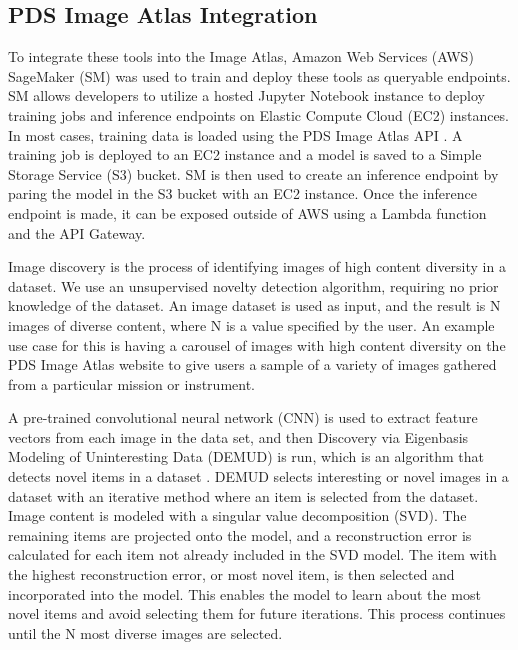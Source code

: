 \subsection{PDS Image Atlas Integration}
To integrate these tools into the Image Atlas, Amazon Web Services (AWS) SageMaker (SM) was used to train and deploy these tools as queryable endpoints. 
SM allows developers to utilize a hosted Jupyter Notebook instance to deploy training jobs and inference endpoints on Elastic Compute Cloud (EC2) instances. 
In most cases, training data is loaded using the PDS Image Atlas API \parencite{grimes2018pds}. 
A training job is deployed to an EC2 instance and a model is saved to a Simple Storage Service (S3) bucket. 
SM is then used to create an inference endpoint by paring the model in the S3 bucket with an EC2 instance. 
Once the inference endpoint is made, it can be exposed outside of AWS using a Lambda function and the API Gateway.

Image discovery is the process of identifying images of high content diversity in a dataset.
We use an unsupervised novelty detection algorithm, requiring no prior knowledge of the dataset. 
An image dataset is used as input, and the result is N images of diverse content, where N is a value specified by the user. 
An example use case for this is having a carousel of images with high content diversity on the PDS Image Atlas website to give users a sample of a variety of images gathered from a particular mission or instrument.

A pre-trained convolutional neural network (CNN) is used to extract feature vectors from each image in the data set, and then Discovery via Eigenbasis Modeling of Uninteresting Data (DEMUD) is run, which is an algorithm that detects novel items in a dataset \parencite{wagstaff_demud}.
DEMUD selects interesting or novel images in a dataset with an iterative method where an item is selected from the dataset. 
Image content is modeled with a singular value decomposition (SVD). 
The remaining items are projected onto the model, and a reconstruction error is calculated for each item not already included in the SVD model. 
The item with the highest reconstruction error, or most novel item, is then selected and incorporated into the model. 
This enables the model to learn about the most novel items and avoid selecting them for future iterations. 
This process continues until the N most diverse images are selected. 
